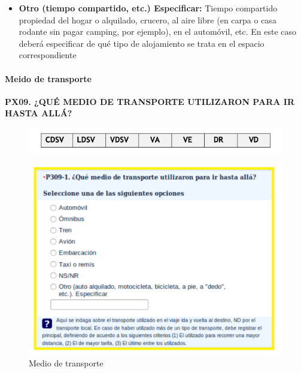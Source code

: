 \documentclass[
  openany]{book}
\begin{document}
\begin{itemize}
\item
  \textbf{Otro (tiempo compartido, etc.) Especificar:} Tiempo compartido propiedad del hogar o alquilado, crucero, al aire libre (en carpa o casa rodante sin pagar camping, por ejemplo), en el automóvil, etc. En este caso deberá especificar de qué tipo de alojamiento se trata en el espacio correspondiente
\end{itemize}

\hypertarget{meido-de-transporte}{%
\paragraph{Meido de transporte}\label{meido-de-transporte}}

\textbf{PX09. ¿QUÉ MEDIO DE TRANSPORTE UTILIZARON PARA IR HASTA ALLÁ?}

\begin{figure}

{\centering \includegraphics[width=1\linewidth]{imagenes/figura6-98} 

}

\end{figure}

\begin{figure}

{\centering \includegraphics[width=1\linewidth]{imagenes/figura6-99} 

}

\caption{Medio de transporte}\label{fig:mediodetrans1}
\end{figure}
\end{document}
